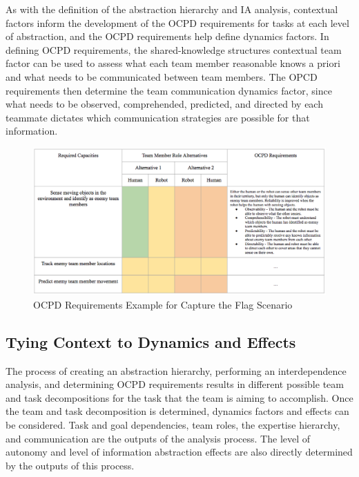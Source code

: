 \documentclass[letterpaper, 10 pt, conference]{ieeeconf}  %
\theoremstyle{definition}
\begin{document}
As with the definition of the abstraction hierarchy and IA analysis, contextual factors inform the development of the OCPD requirements for tasks at each level of abstraction, and the OCPD requirements help define dynamics factors. In defining OCPD requirements, the shared-knowledge structures contextual team factor can be used to assess what each team member reasonable knows a priori and what needs to be communicated between team members. The OPCD requirements then determine the team communication dynamics factor, since what needs to be observed, comprehended, predicted, and directed by each teammate dictates which communication strategies are possible for that information. 


    \begin{figure}[tb]
    \centering
    \includegraphics[width=\textwidth]{OCPDReqs-CtF.png}
   \caption{OCPD Requirements Example for Capture the Flag Scenario}
    \label{fig:ocpd_ctf}
    \end{figure}


\subsection{Tying Context to Dynamics and Effects}
The process of creating an abstraction hierarchy, performing an interdependence analysis, and determining OCPD requirements results in different possible team and task decompositions for the task that the team is aiming to accomplish. Once the team and task decomposition is determined, dynamics factors and effects can be considered. Task and goal dependencies, team roles, the expertise hierarchy, and communication are the outputs of the analysis process. The level of autonomy and level of information abstraction effects are also directly determined by the outputs of this process.
\end{document}
